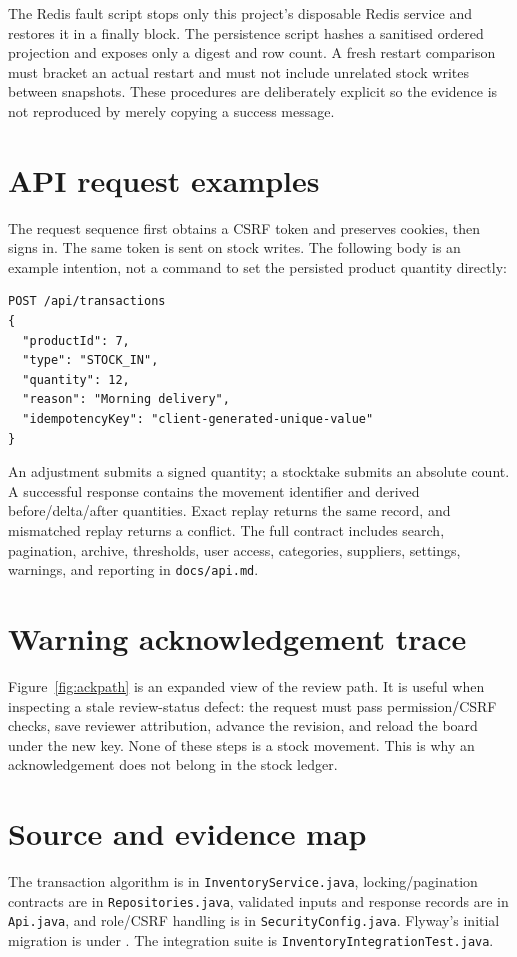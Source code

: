 The Redis fault script stops only this project's disposable Redis service and restores it in a finally block. The persistence script hashes a sanitised ordered projection and exposes only a digest and row count. A fresh restart comparison must bracket an actual restart and must not include unrelated stock writes between snapshots. These procedures are deliberately explicit so the evidence is not reproduced by merely copying a success message.

\section{API request examples}
The request sequence first obtains a CSRF token and preserves cookies, then signs in. The same token is sent on stock writes. The following body is an example intention, not a command to set the persisted product quantity directly:
\begin{lstlisting}
POST /api/transactions
{
  "productId": 7,
  "type": "STOCK_IN",
  "quantity": 12,
  "reason": "Morning delivery",
  "idempotencyKey": "client-generated-unique-value"
}
\end{lstlisting}

An adjustment submits a signed quantity; a stocktake submits an absolute count. A successful response contains the movement identifier and derived before/delta/after quantities. Exact replay returns the same record, and mismatched replay returns a conflict. The full contract includes search, pagination, archive, thresholds, user access, categories, suppliers, settings, warnings, and reporting in \texttt{docs/api.md}.

\section{Warning acknowledgement trace}
Figure~\ref{fig:ackpath} is an expanded view of the review path. It is useful when inspecting a stale review-status defect: the request must pass permission/CSRF checks, save reviewer attribution, advance the revision, and reload the board under the new key. None of these steps is a stock movement. This is why an acknowledgement does not belong in the stock ledger.


\section{Source and evidence map}
The transaction algorithm is in \texttt{InventoryService.java}, locking/pagination contracts are in \texttt{Repositories.java}, validated inputs and response records are in \texttt{Api.java}, and role/CSRF handling is in \texttt{SecurityConfig.java}. Flyway's initial migration is under . The integration suite is \texttt{InventoryIntegrationTest.java}.

